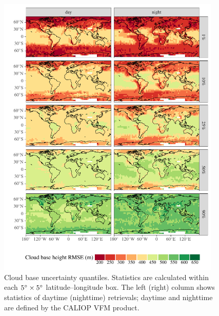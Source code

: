 \documentclass[essd,manuscript]{copernicus}\usepackage[]{graphicx}\usepackage[]{color}
\newenvironment{knitrout}{}{} %
\begin{document}
\begin{figure}
  \centering
\begin{knitrout}
\color{fgcolor}

{\centering \includegraphics[width=0.95\textwidth]{figure/method-cbase-uncert-quantiles-1} 

}



\end{knitrout}
  \caption{Cloud base uncertainty quantiles.  Statistics are calculated within
    each $5^{\circ}\times 5^{\circ}$ latitude--longitude box.  The left (right)
    column shows statistics of daytime (nighttime) retrievals; daytime and
    nighttime are defined by the CALIOP VFM product.}
  \label{fig:uncert-quantiles}
\end{figure}
\end{document}
